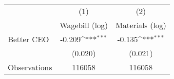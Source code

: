 {
\def\sym#1{\ifmmode^{#1}\else\(^{#1}\)\fi}
\begin{tabular}{l*{2}{c}}
\hline\hline
                    &\multicolumn{1}{c}{(1)}&\multicolumn{1}{c}{(2)}\\
                    &\multicolumn{1}{c}{Wagebill (log)}&\multicolumn{1}{c}{Materials (log)}\\
\hline
Better CEO          &      -0.209\sym{***}&      -0.135\sym{***}\\
                    &     (0.020)         &     (0.021)         \\
\hline
Observations        &      116058         &      116058         \\
\hline\hline
\end{tabular}
}
